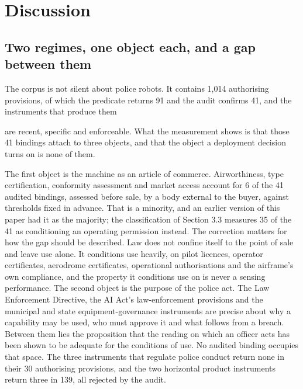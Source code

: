 \section{Discussion}\label{sec:4}

\subsection{Two regimes, one object each, and a gap between them}\label{sec:4.1}

The corpus is not silent about police robots. It contains 1,014 authorising provisions, of which the predicate returns 91 and the audit confirms 41, and the instruments that produce them

are recent, specific and enforceable. What the measurement shows is that those 41 bindings attach to three objects, and that the object a deployment decision turns on is none of them.

The first object is the machine as an article of commerce. Airworthiness, type certification, conformity assessment and market access account for 6 of the 41 audited bindings, assessed before sale, by a body external to the buyer, against thresholds fixed in advance. That is a minority, and an earlier version of this paper had it as the majority; the classification of Section 3.3 measures 35 of the 41 as conditioning an operating permission instead. The correction matters for how the gap should be described. Law does not confine itself to the point of sale and leave use alone. It conditions use heavily, on pilot licences, operator certificates, aerodrome certificates, operational authorisations and the airframe's own compliance, and the property it conditions use on is never a sensing performance. The second object is the purpose of the police act. The Law Enforcement Directive, the AI Act's law-enforcement provisions and the municipal and state equipment-governance instruments are precise about why a capability may be used, who must approve it and what follows from a breach. Between them lies the proposition that the reading on which an officer acts has been shown to be adequate for the conditions of use. No audited binding occupies that space. The three instruments that regulate police conduct return none in their 30 authorising provisions, and the two horizontal product instruments return three in 139, all rejected by the audit.


